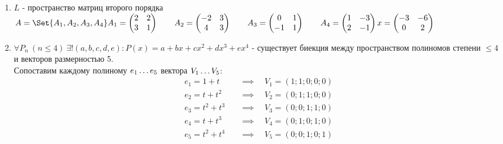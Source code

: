 \begin{enumerate}
    \item $L$ - пространство матриц второго порядка\\
    $\displaystyle A = \Set{A_1, A_2, A_3, A_4}\\
    A_1 = \begin{pmatrix}2 & 2 \\ 3 & 1\end{pmatrix}\qquad
    A_2 = \begin{pmatrix}-2 & 3 \\ 4 & 3\end{pmatrix}\qquad
    A_3 = \begin{pmatrix}0 & 1 \\ -1 & 1\end{pmatrix}\qquad
    A_4 = \begin{pmatrix}1 & -3 \\ 2 & -1\end{pmatrix}\\
    x = \begin{pmatrix}-3 & -6 \\ 0 & 2\end{pmatrix}$
    \item $\forall P_n \ (n \leq 4) \ \exists! (a, b, c, d, e) : P(x) = a + bx + cx^2 + dx^3 + ex^4$ -
    существует биекция между пространством полиномов степени $\leq 4$ и векторов размерностью 5.\\
    Сопоставим каждому полиному $e_1 \mathellipsis e_5$ вектора $V_1 \mathellipsis V_5$:\\
    \begin{align*}
    e_1 = 1 + t \quad &\implies \quad V_1 = (1; 1; 0; 0; 0)\\
    e_2 = t + t^2 \quad &\implies \quad V_2 = (0; 1; 1; 0; 0)\\
    e_3 = t^2 + t^3 \quad &\implies \quad V_3 = (0; 0; 1; 1; 0)\\
    e_4 = t + t^3 \quad &\implies \quad V_4 = (0; 1; 0; 1; 0)\\
    e_5 = t^2 + t^4 \quad &\implies \quad V_5 = (0; 0; 1; 0; 1)\\
    \end{align*}


\end{enumerate}

